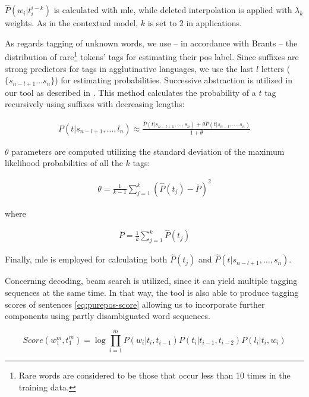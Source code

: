 \label{sec:purepos-guesser}
$\hat{P}(w_i|t_{i}^{i-k})$ is calculated with \acrlong{mle}, while deleted interpolation is applied with $\lambda_k$ weights. 
As in the contextual model, $k$ is set to 2 in applications.

As regards tagging of unknown words, we use -- in accordance with Brants -- the distribution of rare\footnote{Rare words are considered to be those that occur less than 10 times in the training data.}
tokens’ tags for estimating their \gls{pos} label. 
Since suffixes are strong predictors for tags in agglutinative languages, we use the last $l$ letters ($\{s_{n-l+1} \dots s_n\}$) for estimating probabilities. 
Successive abstraction is utilized in our tool as described in \cite{Samuelsson1993,Brants2000}.
This method calculates the probability of a $t$ tag recursively using suffixes with decreasing lengths: 

\begin{align}
 P(t|s_{n-l+1}, \dots, l_n) 
 \approx \frac{ \hat{P}(t|s_{n-l+1}, \dots, s_n) + \theta \hat{P}(t|s_{n-l}, \dots, s_n)}{1+\theta}
\end{align}

$\theta$ parameters are computed utilizing the standard deviation of the maximum likelihood probabilities of all the $k$ tags:

\begin{align}
	\theta = \frac{1}{k-1}\sum_{j=1}^k(\hat{P}(t_j)-\overline{P})^2
\end{align}

where

\begin{align}
	\overline{P} = \frac{1}{k}\sum_{j=1}^{k}\hat{P}(t_j)
\end{align}

Finally, \gls{mle} is employed for calculating both $\hat{P}(t_j)$ and $\hat{P}(t|s_{n-l+1}, \dots, s_n)$. 


Concerning decoding, beam search is utilized, since it can yield multiple tagging sequences at the same time. 
In that way, the tool is also able to produce tagging scores of sentences \eqref{eq:purepos-score} allowing us to incorporate further components using partly disambiguated word sequences. 

\begin{equation}\label{eq:purepos-score} %
Score(w_1^m,t_1^m) = \log \prod_{i=1}^m P(w_i|t_i,t_{i-1})P(t_i|t_{i-1},t_{i-2})P(l_i|t_i,w_i)
\end{equation}

